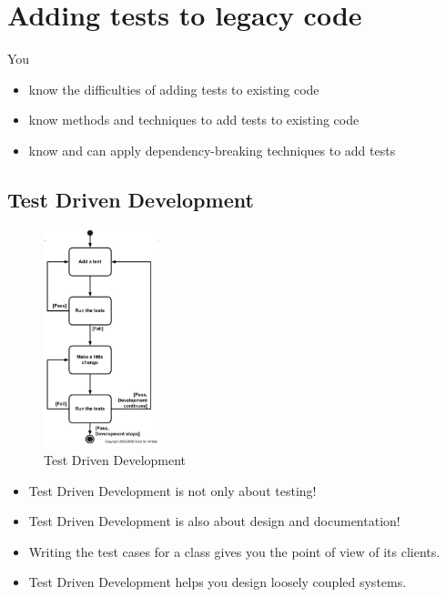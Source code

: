\hypertarget{adding-tests-to-legacy-code}{%
\section{Adding tests to legacy
code}\label{adding-tests-to-legacy-code}}

\begin{tcolorbox}[colback=blue!5!white,colframe=blue!75!black]
You

\begin{itemize}
\tightlist
\item
  know the difficulties of adding tests to existing code
\item
  know methods and techniques to add tests to existing code
\item
  know and can apply dependency-breaking techniques to add tests
\end{itemize}
\end{tcolorbox}

\hypertarget{test-driven-development}{%
\subsection{Test Driven Development}\label{test-driven-development}}

\begin{figure}[H]
\centering
\includegraphics[width=0.3\textwidth]{figures/tdd.png}
\caption{Test Driven Development}
\end{figure}

\begin{itemize}
\tightlist
\item
  Test Driven Development is not only about testing!
\item
  Test Driven Development is also about design and documentation!
\item
  Writing the test cases for a class gives you the point of view of its
  clients.
\item
  Test Driven Development helps you design loosely coupled systems.
\end{itemize}

